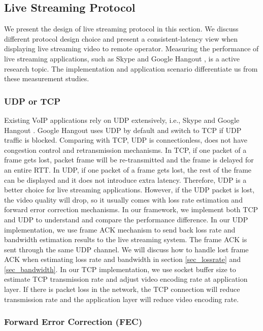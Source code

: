 \subsection{Live Streaming Protocol}
\label{streaming_protocol}


We present the design of live streaming protocol in this section. 
We discuss different protocol design choice and present a consistent-latency
view when displaying live streaming video to remote operator. 
Measuring the performance of live streaming applications, such as 
Skype \cite{zhang2012profiling} and Google Hangout \cite{yu2014can}, 
is a active research topic. 
The implementation and application scenario differentiate us from
these measurement studies. 


\subsubsection{UDP or TCP}
\label{sec_udp_tcp}

Existing VoIP applications rely on UDP extensively, 
i.e., Skype \cite{zhang2012profiling} and Google Hangout \cite{yu2014can}.
Google Hangout uses UDP by default and switch to TCP if UDP traffic 
is blocked. 
Comparing with TCP, UDP is connectionless, does not have 
congestion control and retransmission mechanisms. 
In TCP, if one packet of a frame gets lost, 
packet frame will be re-transmitted and 
the frame is delayed for an entire RTT. 
In UDP, if one packet of a frame gets lost, 
the rest of the frame can be displayed and 
it does not introduce extra latency. 
Therefore, UDP is a better choice for live streaming
applications. 
However, if the UDP packet is lost, the video quality
will drop, 
so it usually comes with loss rate estimation and 
forward error correction mechanisms. 
In our framework, we implement both TCP and UDP
to understand and compare the performance difference.
In our UDP implementation, we use frame ACK 
mechanism to send back loss rate and bandwidth
estimation results to the live streaming system. 
The frame ACK is sent through the same UDP channel. 
We will discuss how to handle lost frame ACK
when estimating loss rate and bandwidth in section 
\ref{sec_lossrate} and \ref{sec_bandwidth}. 
In our TCP implementation, we use socket buffer size 
to estimate TCP transmission rate and adjust
video encoding rate at application layer. 
If there is packet loss in the network, the TCP connection
will reduce transmission rate and the application layer
will reduce video encoding rate. 


\subsubsection{Forward Error Correction (FEC)}
\label{sec_fec}

